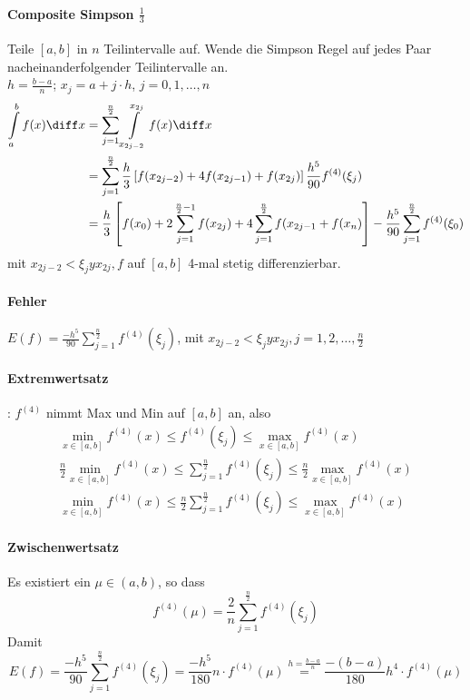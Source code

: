 \paragraph{Composite Simpson $\frac{1}{3}$}
Teile $[a,b]$ in $n$ Teilintervalle auf. Wende die Simpson Regel auf jedes Paar nacheinanderfolgender Teilintervalle an.\\
$h = \frac{b-a}{n}$; $x_j=a+j\cdot h$, $j=0,1,\ldots ,n$
\begin{equation}
\begin{split}
\int\limits_a^bf(x)\diff x &= \sum_{j=1}^{\frac{n}{2}}\int\limits_{x_{2j-2}}^{x_{2j}}f(x)\diff x\\
&= \sum_{j=1}^{\frac{n}{2}}\frac{h}{3}\left[f(x_{2j-2})+4f(x_{2j-1})+f(x_{2j})\right]\frac{h^5}{90}f^{(4)}(\xi_j)\\
&= \frac{h}{3}\left[f(x_0)+2\sum_{j=1}^{\frac{n}{2}-1}f(x_{2j}) + 4\sum_{j=1}^{\frac{n}{2}}f(x_{2j-1} + f(x_n)\right] - \frac{h^5}{90}\sum_{j=1}^{\frac{n}{2}}f^{(4)}(\xi_0)
\end{split}
\end{equation}
mit $x_{2j-2} < \xi_j y x_{2j}, f$ auf $[a,b]$ 4-mal stetig differenzierbar.

\paragraph{Fehler} $E(f) = \frac{-h^5}{90}\sum_{j=1}^{\frac{n}{2}}f^{(4)}(\xi_j)$, mit $x_{2j-2} < \xi_j y x_{2j}, j=1,2,\ldots,\frac{n}{2}$

\paragraph{Extremwertsatz}: $f^{(4)}$ nimmt Max und Min auf $[a,b]$ an, also
\begin{equation}
\begin{split}
\min\limits_{x\in[a,b]}f^{(4)}(x) \leq f^{(4)}(\xi_j) \leq \max\limits_{x\in[a,b]}f^{(4)}(x)\\
\frac{n}{2}\min\limits_{x\in[a,b]}f^{(4)}(x) \leq \sum_{j=1}^{\frac{n}{2}}f^{(4)}(\xi_j) \leq \frac{n}{2}\max\limits_{x\in[a,b]}f^{(4)}(x)\\
\min\limits_{x\in[a,b]}f^{(4)}(x) \leq \frac{n}{2}\sum_{j=1}^{\frac{n}{2}}f^{(4)}(\xi_j) \leq \max\limits_{x\in[a,b]}f^{(4)}(x)
\end{split}
\end{equation}

\paragraph{Zwischenwertsatz} Es existiert ein $\mu\in(a,b)$, so dass
\begin{equation}
f^{(4)}(\mu) = \frac{2}{n}\sum_{j=1}^{\frac{n}{2}}f^{(4)}(\xi_j)
\end{equation}
Damit
\begin{equation}
E(f) = \frac{-h^5}{90}\sum_{j=1}^{\frac{n}{2}}f^{(4)}(\xi_j) = \frac{-h^5}{180}n\cdot f^{(4)}(\mu) \overset{h=\frac{b-a}{n}}{=} \frac{-(b-a)}{180}h^4\cdot f^{(4)}(\mu)
\end{equation}

